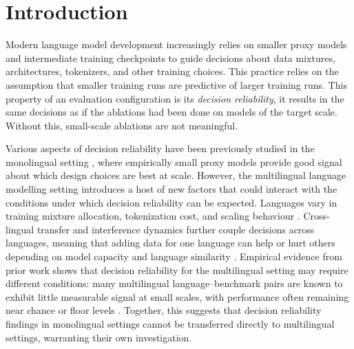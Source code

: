 \section{Introduction}
\label{sec:introduction}

Modern language model development increasingly relies on smaller proxy models and intermediate training checkpoints to guide decisions about data mixtures, architectures, tokenizers, and other training choices.
This practice relies on the assumption that smaller training runs are predictive of larger training runs. 
This property of an evaluation configuration is its \emph{decision reliability}, \ie it results in the same decisions as if the ablations had been done on models of the target scale. Without this, small-scale ablations are not meaningful. %

Various aspects of decision reliability have been previously studied in the monolingual setting \citep{magnusson_datadecide_2025}, where empirically small proxy models provide good signal about which design choices are best at scale.
However, the multilingual language modelling setting introduces a host of new factors that could interact with the conditions under which decision reliability can be expected. 
Languages vary in training mixture allocation, tokenization cost, and scaling behaviour \citep{petrov_language_2023, ahia_all_2023,muenninghoff_data_constrained_2023}. Cross-lingual transfer and interference dynamics further couple decisions across languages, meaning that adding data for one language can help or hurt others depending on model capacity and language similarity \citep{chang-etal-2024-multilinguality, longpre_atlas_2026}. 
Empirical evidence from prior work shows that decision reliability for the multilingual setting may require different conditions: many multilingual language--benchmark pairs are known to exhibit little measurable signal at small scales, with performance often remaining near chance or floor levels \citeneeded{}. 
Together, this suggests that decision reliability findings in monolingual settings cannot be transferred directly to multilingual settings, warranting their own investigation. 


